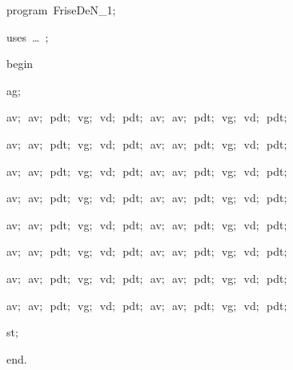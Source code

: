 
{
\parindent {}
\medskip

\carrenoir
\vspace{\neglskip}\mbox{\blc  \idt  \mcl program\idt \ FriseDeN\_1$;$
}\par 
\vspace{\neglskip}\mbox{\blc \blk\idt \mcl uses\idt \ \ldots\ $;$
}\par 
\pagebreak[3] 
\vspace{\neglskip}\mbox{\blc  \idt  \mcl begin\idt \ }\par 
\vspace{\neglskip}\mbox{\blc  \blk\idt  ag$;$}\par 
\vspace{\neglskip}\mbox{\blc  \blk\idt  av$;$\ av$;$\ pdt$;$\ vg$;$\ vd$;$\ pdt$;$\ av$;$\ av$;$\ pdt$;$\ vg$;$\ vd$;$\ pdt$;$\ }\par 
\vspace{\neglskip}\mbox{\blc  \blk\idt  av$;$\ av$;$\ pdt$;$\ vg$;$\ vd$;$\ pdt$;$\ av$;$\ av$;$\ pdt$;$\ vg$;$\ vd$;$\ pdt$;$\ }\par 
\vspace{\neglskip}\mbox{\blc  \blk\idt  av$;$\ av$;$\ pdt$;$\ vg$;$\ vd$;$\ pdt$;$\ av$;$\ av$;$\ pdt$;$\ vg$;$\ vd$;$\ pdt$;$\ }\par 
\vspace{\neglskip}\mbox{\blc  \blk\idt  av$;$\ av$;$\ pdt$;$\ vg$;$\ vd$;$\ pdt$;$\ av$;$\ av$;$\ pdt$;$\ vg$;$\ vd$;$\ pdt$;$\ }\par 
\vspace{\neglskip}\mbox{\blc  \blk\idt  av$;$\ av$;$\ pdt$;$\ vg$;$\ vd$;$\ pdt$;$\ av$;$\ av$;$\ pdt$;$\ vg$;$\ vd$;$\ pdt$;$\ }\par 
\vspace{\neglskip}\mbox{\blc  \blk\idt  av$;$\ av$;$\ pdt$;$\ vg$;$\ vd$;$\ pdt$;$\ av$;$\ av$;$\ pdt$;$\ vg$;$\ vd$;$\ pdt$;$\ }\par 
\vspace{\neglskip}\mbox{\blc  \blk\idt  av$;$\ av$;$\ pdt$;$\ vg$;$\ vd$;$\ pdt$;$\ av$;$\ av$;$\ pdt$;$\ vg$;$\ vd$;$\ pdt$;$\ }\par 
\vspace{\neglskip}\mbox{\blc  \blk\idt  av$;$\ av$;$\ pdt$;$\ vg$;$\ vd$;$\ pdt$;$\ av$;$\ av$;$\ pdt$;$\ vg$;$\ vd$;$\ pdt$;$\ }\par 
\vspace{\neglskip}\mbox{\blc  \blk\idt  st$;$}\par 
\vspace{\neglskip}\mbox{\blc  \idt  \mcl end\idt $.$}\par 

\medskip }

